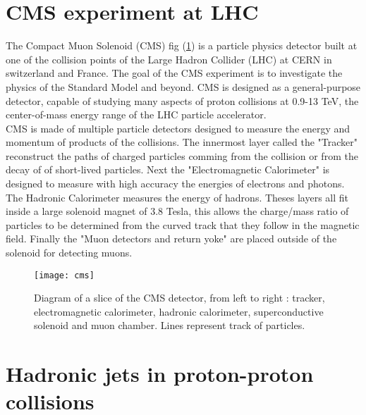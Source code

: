 \label{chap:premierchapitre}

\section{CMS experiment at LHC}

The Compact Muon Solenoid (CMS) fig (\ref{cms}) is a particle physics detector built at one of the collision points of the Large Hadron Collider
(LHC) at CERN in switzerland and France. The goal of the CMS experiment is to investigate the physics of the Standard Model and beyond.
CMS is designed as a general-purpose detector, capable of studying many aspects of proton collisions at 0.9-13 TeV, the
center-of-mass energy range of the LHC particle accelerator.\\
CMS is made of multiple particle detectors designed to measure the energy and momentum of products of the collisions.
The innermost layer called the "Tracker" reconstruct the paths of charged particles comming from the collision or from the
decay of of short-lived particles.
Next the "Electromagnetic Calorimeter" is designed to measure with high accuracy the energies of electrons and
photons.\\
The Hadronic Calorimeter measures the energy of hadrons.%
Theses layers all fit inside a large solenoid magnet of 3.8 Tesla, this allows the charge/mass ratio of particles to be
determined from the curved track that they follow in the magnetic field.
Finally the "Muon detectors and return yoke" are placed outside of the solenoid for detecting muons.

\begin{figure}[h!]
  \centering
  \texttt{[image: cms]}\\[1cm]
  \caption{Diagram of a slice of the CMS detector, from left to right : tracker, electromagnetic calorimeter, hadronic
  calorimeter, superconductive solenoid and muon chamber. Lines represent track of particles.}
  \label{cms}
\end{figure}




\section{Hadronic jets in proton-proton collisions}

